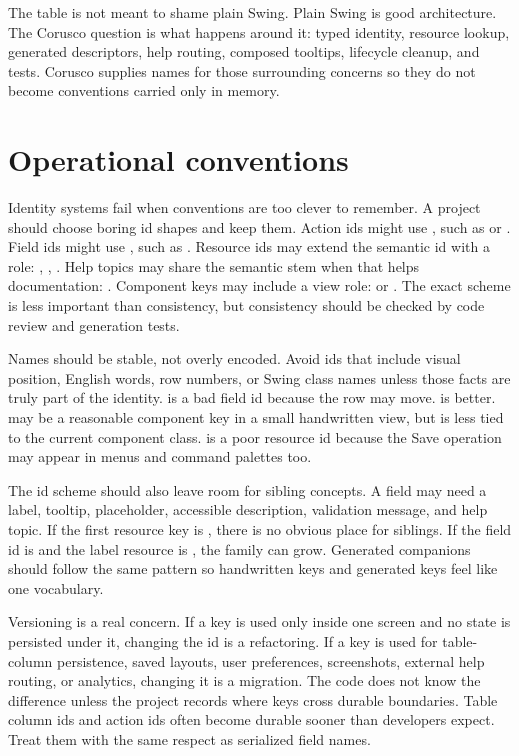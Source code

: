 The table is not meant to shame plain Swing. Plain Swing  is good
architecture. The Corusco question is what happens around it: typed identity,
resource lookup, generated descriptors, help routing, composed tooltips,
lifecycle cleanup, and tests. Corusco supplies names for those surrounding
concerns so they do not become conventions carried only in memory.

\section{Operational conventions}

Identity systems fail when conventions are too clever to remember. A project
should choose boring id shapes and keep them. Action ids might use
, such as  or
. Field ids might use , such as
. Resource ids may extend the semantic id with a role:
, ,
. Help topics may share the semantic stem when that
helps documentation: . Component keys may include a view
role:  or . The exact
scheme is less important than consistency, but consistency should be checked
by code review and generation tests.

Names should be stable, not overly encoded. Avoid ids that include visual
position, English words, row numbers, or Swing class names unless those facts
are truly part of the identity.  is a
bad field id because the row may move.  is better.
 may be a reasonable component key in a small
handwritten view, but  is less tied to the current
component class.  is a poor resource id because the Save
operation may appear in menus and command palettes too.

The id scheme should also leave room for sibling concepts. A field may need a
label, tooltip, placeholder, accessible description, validation message, and
help topic. If the first resource key is , there is no
obvious place for siblings. If the field id is  and the
label resource is , the family can grow. Generated
companions should follow the same pattern so handwritten keys and generated
keys feel like one vocabulary.

Versioning is a real concern. If a key is used only inside one screen and no
state is persisted under it, changing the id is a refactoring. If a key is used
for table-column persistence, saved layouts, user preferences, screenshots,
external help routing, or analytics, changing it is a migration. The code does
not know the difference unless the project records where keys cross durable
boundaries. Table column ids and action ids often become durable sooner than
developers expect. Treat them with the same respect as serialized field names.


